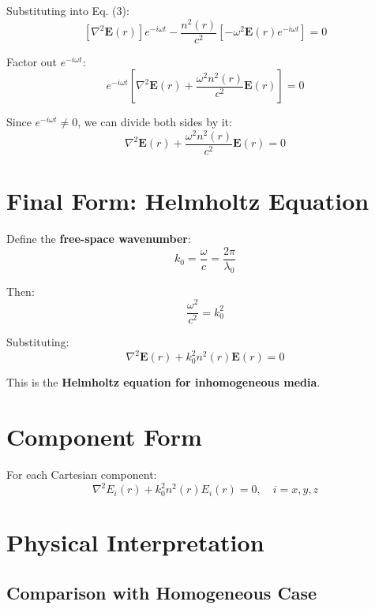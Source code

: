 \documentclass[12pt]{article}
\begin{document}
Substituting into Eq. (3):
\begin{equation}
\left[\nabla^2 \mathbf{E}(r)\right] e^{-i\omega t} - \frac{n^2(r)}{c^2} \left[-\omega^2 \mathbf{E}(r) e^{-i\omega t}\right] = 0
\end{equation}

Factor out $e^{-i\omega t}$:
\begin{equation}
e^{-i\omega t} \left[\nabla^2 \mathbf{E}(r) + \frac{\omega^2 n^2(r)}{c^2} \mathbf{E}(r)\right] = 0
\end{equation}

Since $e^{-i\omega t} \neq 0$, we can divide both sides by it:
\begin{equation}
\nabla^2 \mathbf{E}(r) + \frac{\omega^2 n^2(r)}{c^2} \mathbf{E}(r) = 0
\end{equation}

\section{Final Form: Helmholtz Equation}

Define the \textbf{free-space wavenumber}:
\begin{equation}
k_0 = \frac{\omega}{c} = \frac{2\pi}{\lambda_0}
\end{equation}

Then:
\begin{equation}
\frac{\omega^2}{c^2} = k_0^2
\end{equation}

Substituting:
\begin{equation}
\boxed{\nabla^2 \mathbf{E}(r) + k_0^2 n^2(r) \mathbf{E}(r) = 0}
\end{equation}

This is the \textbf{Helmholtz equation for inhomogeneous media}.

\section{Component Form}

For each Cartesian component:
\begin{equation}
\nabla^2 E_i(r) + k_0^2 n^2(r) E_i(r) = 0, \quad i = x, y, z
\end{equation}

\section{Physical Interpretation}

\subsection{Comparison with Homogeneous Case}
\end{document}

